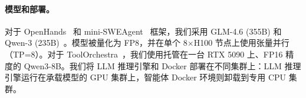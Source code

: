 \paragraph{模型和部署。}
\vspace{-2mm}
对于 OpenHands~\citep{wang2025openhandsopenplatformai} 和 mini-SWEAgent~\citep{yang2024sweagentagentcomputerinterfacesenable} 框架，我们采用 GLM-4.6 (355B) \citep{5team2025glm45agenticreasoningcoding} 和 Qwen-3 (235B)~\citep{yang2025qwen3technicalreport}。模型被量化为 FP8，并在单个 8$\times$H100 节点上使用张量并行（TP=8）。对于 ToolOrchestra~\citep{su2025toolorchestraelevatingintelligenceefficient}，我们使用托管在一台 RTX 5090 上、FP16 精度的 Qwen3-8B。我们将 LLM 推理引擎和 Docker 部署在不同集群上：LLM 推理引擎运行在承载模型的 GPU 集群上，智能体 Docker 环境则卸载到专用 CPU 集群。



\vspace{-2mm}
